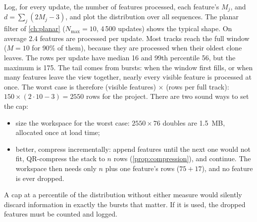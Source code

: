 \begin{solutions}
  \item Log, for every update, the number of features processed, each feature's $M_j$, and $d = \sum_j(2M_j - 3)$, and plot the distribution over all sequences. The
        planar filter of \cref{ch:planar} ($N_{\max} = 10$, 4\,500 updates) shows the typical shape. On average 2.4 features are processed per update. Most tracks reach the full
        window ($M = 10$ for 90\% of them), because they are processed when their oldest clone leaves. The rows per update have median 16 and 99th percentile 56,
        but the maximum is 175. The tail comes from bursts: when the window first fills, or when many features leave the view together, nearly every visible
        feature is processed at once. The worst case is therefore (visible features)$\,\times\,$(rows per full track): $150\times(2\cdot10 - 3) = 2550$ rows for the
        project. There are two sound ways to set the cap:
        \begin{itemize}
          \item size the workspace for the worst case: $2550\times76$ doubles are 1.5~MB, allocated once at load time;
          \item better, compress incrementally: append features until the next one would not fit, QR-compress the stack to $n$ rows
                (\cref{prop:compression}), and continue. The workspace then needs only $n$ plus one feature's rows ($75 + 17$), and no feature is ever dropped.
        \end{itemize}
        A cap at a percentile of the distribution without either measure would silently discard information in exactly the bursts that matter. If it is used,
        the dropped features must be counted and logged.


\end{solutions}
